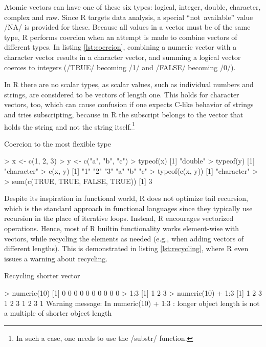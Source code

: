 {Atomic vectors can have one of these six types: logical, integer, double, character, complex and raw. Since R targets data analysis, a special ``not~available'' value \rinline/NA/ is provided for these. Because all values in a vector must be of the same type, R performs coercion when an attempt is made to combine vectors of different types. In listing \ref{lst:coercion}, combining a numeric vector with a character vector results in a character vector, and summing a logical vector coerces to integers (\rinline/TRUE/ becoming \rinline/1/ and \rinline/FALSE/ becoming \rinline/0/).

In R there are no scalar types, as scalar values, such as individual numbers and strings, are considered to be vectors of length one. This holds for character vectors, too, which can cause confusion if one expects C-like behavior of strings and tries subscripting, because in R the subscript belongs to the vector that holds the string and not the string itself.\footnote{In such a case, one needs to use the \rinline/substr/ function.}

\begin{listing}[htbp]
  \caption{\label{lst:coercion}Coercion to the most flexible type}
  \begin{rcode}
> x <- c(1, 2, 3)
> y <- c("a", "b", "c")
> typeof(x)
[1] "double"
> typeof(y)
[1] "character"
> c(x, y)
[1] "1" "2" "3" "a" "b" "c"
> typeof(c(x, y))
[1] "character"
>
> sum(c(TRUE, TRUE, FALSE, TRUE))
[1] 3
  \end{rcode}
\end{listing}

Despite its inspiration in functional world, R does not optimize tail recursion, which is the standard approach in functional languages since they typically use recursion in the place of iterative loops. Instead, R encourages vectorized operations. Hence, most of R builtin functionality works element-wise with vectors, while recycling the elements as needed (e.g., when adding vectors of different lengths). This is demonstrated in listing \ref{lst:recycling}, where R even issues a warning about recycling.

\begin{listing}[htbp]
  \caption{\label{lst:recycling}Recycling shorter vector}
  \begin{rcode}
> numeric(10)
 [1] 0 0 0 0 0 0 0 0 0 0
> 1:3
[1] 1 2 3
> numeric(10) + 1:3
 [1] 1 2 3 1 2 3 1 2 3 1
Warning message:
In numeric(10) + 1:3 :
  longer object length is not a multiple of shorter object length
  \end{rcode}
\end{listing}

}
